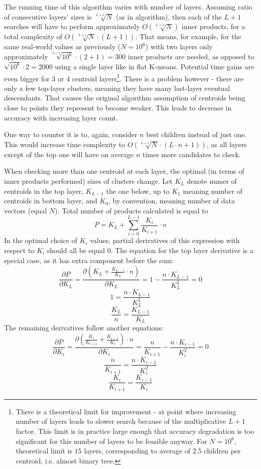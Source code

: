 The running time of this algorithm varies with number of layers. Assuming 
ratio of consecutive layers' sizes is $ \sqrt[L+1]{N} $ (as in algorithm),
then each of the $ L + 1 $ searches will have to perform approximately
$ O(\sqrt[L+1]{N}) $ inner products, for a total complexity of
$ O(\sqrt[L+1]{N} \cdot (L + 1)) $. That means, for example, for the same real-world
values as previously ($ N=10^6 $) with two layers only approximately
$ \sqrt[2+1]{10^6} \cdot (2 + 1) = 300 $ inner products are needed, as opposed
to $ \sqrt{10^6} \cdot 2 = 2000 $ using a single layer like in flat K-means.
Potential time gains are even bigger for 3 or 4 centroid layers\footnote{
There is a theoretical limit for improvement - at point where increasing
number of layers leads to slower search because of the multiplicative $L+1$ factor.
This limit is in practice large enough that accuracy degradation is too 
significant for this number of layers to be feasible anyway. 
For $N=10^6$, theoretical limit is $15$ layers, corresponding to average 
of $2.5$ children per centroid, i.e. almost binary tree.
}. There is a problem however - there are only a few top-layer clusters, 
meaning they have many last-layer eventual descendants. That causes the
original algorithm assumption of centroids being close to points they represent
to become weaker. This leads to decrease in accuracy with increasing layer
count.

One way to counter it is to, again, consider $n$ best children instead of
just one. This would increase time complexity to 
$ O(\sqrt[L+1]{N} \cdot (L \cdot n + 1)) $, as all layers except of the top one
will have on average $n$ times more candidates to check.

When checking more than one centroid at each layer, the optimal (in terms
of inner products performed) sizes of clusters change. Let $ K_L $ denote
numer of centroids in the top layer, $ K_{L-1} $ the one below, up to
$ K_1 $ meaning number of centroids in bottom layer, and $ K_0 $, by 
convention, meaning number of data vectors (equal $N$). Total number of
products calculated is equal to 
$$ P = K_L + \sum_{i=0}^{L-1} \frac{K_i}{K_{i+1}} \cdot n $$
In the optimal choice of $K_i$ values, partial derivatives of this expression
with respect to $K_i$ should all be equal 0. The equation for the top layer 
derivative is a special case, as it has extra component before the sum:
$$ 
\frac{\partial P}{\partial K_L} = 
\frac{\partial (K_L + \frac{K_{L-1}}{K_L} \cdot n)}{\partial K_L} =
1 -\frac{n \cdot K_{L-1}}{K_L^2} = 
0
$$
$$
1 = \frac{n \cdot K_{L-1}}{K_L^2}
$$
$$
\frac{K_L}{n} = \frac{K_{L-1}}{K_L}
$$
The remaining derivatives follow another equations:
$$
\frac{\partial P}{\partial K_i} =
\frac{\partial (\frac{K_i}{K_{i+1}} + \frac{K_{i-1}}{K_i}) \cdot n}{\partial K_i} =
\frac{n}{K_{i+1}} - \frac{n \cdot K_{i-1}}{K_i^2} = 0
$$
$$
\frac{n}{K_{i+1}} = \frac{n \cdot K_{i-1}}{K_i^2}
$$
$$
\frac{K_i}{K_{i+1}} = \frac{K_{i-1}}{K_i}
$$

